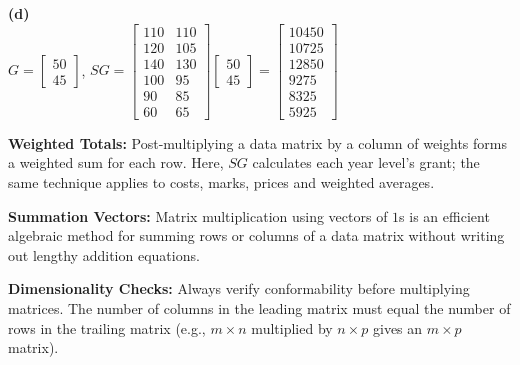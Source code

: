 \begin{solution}
\medskip
\textbf{(d)} \\
$G = \begin{bmatrix} 50 \\ 45 \end{bmatrix}$, \quad
$SG = \begin{bmatrix} 110 & 110 \\ 120 & 105 \\ 140 & 130 \\ 100 & 95 \\ 90 & 85 \\ 60 & 65 \end{bmatrix} \begin{bmatrix} 50 \\ 45 \end{bmatrix} = \begin{bmatrix} 10450 \\ 10725 \\ 12850 \\ 9275 \\ 8325 \\ 5925 \end{bmatrix}$
\end{solution}

\begin{takeaways}
\item \textbf{Weighted Totals:} Post-multiplying a data matrix by a column of weights forms a weighted sum for each row. Here, $SG$ calculates each year level's grant; the same technique applies to costs, marks, prices and weighted averages.
\item \textbf{Summation Vectors:} Matrix multiplication using vectors of $1$s is an efficient algebraic method for summing rows or columns of a data matrix without writing out lengthy addition equations.
\item \textbf{Dimensionality Checks:} Always verify conformability before multiplying matrices. The number of columns in the leading matrix must equal the number of rows in the trailing matrix (e.g., $m \times n$ multiplied by $n \times p$ gives an $m \times p$ matrix).
\end{takeaways}

